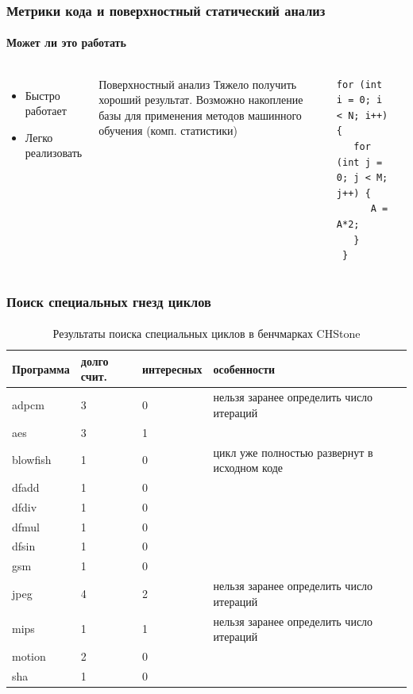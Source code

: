 \documentclass{beamer}              %
\begin{document}
\begin{frame}[fragile]
\frametitle{Метрики кода и поверхностный статический анализ}
  \framesubtitle{Может ли это работать}
  \begin{columns}
      \begin{itemize}
        \item Быстро работает
        \item Легко реализовать
      \end{itemize}
      
      \begin{block}{Поверхностный анализ}
         Тяжело получить хороший результат. Возможно накопление базы для применения методов машинного обучения (комп. статистики)
      \end{block}

      
      
\begin{lstlisting}[frame=single]
 for (int i = 0; i < N; i++) {
   for (int j = 0; j < M; j++) {
      A = A*2;
   }
 }
\end{lstlisting}
\label{clone_listing}
      
  \end{columns}
  
\end{frame}

\begin{frame}[fragile]
\frametitle{Поиск специальных гнезд циклов}
  \framesubtitle{}
  \begin{table}
    \begin{tabular}{ | p{1.5cm} | p{2cm} | p{1cm} | p{6cm} |}
    \hline
    Программа & долго счит. & интересных & особенности \\ \hline
    adpcm & 3 & 0 & нельзя заранее определить число итераций \\ \hline
    aes & 3 & 1 &  \\ \hline
    blowfish & 1 & 0 & цикл уже полностью развернут в исходном коде \\ \hline
    dfadd & 1 & 0 &  \\ \hline
    dfdiv & 1 & 0 &  \\ \hline
    dfmul & 1 & 0 &  \\ \hline
    dfsin & 1 & 0 &  \\ \hline
    gsm & 1 & 0 &  \\ \hline
    jpeg & 4 & 2 & нельзя заранее определить число итераций \\ \hline
    mips & 1 & 1 & нельзя заранее определить число итераций \\ \hline
    motion & 2 & 0 &  \\ \hline
    sha & 1 & 0 &  \\ \hline
    \end{tabular} 
    \caption{Результаты поиска специальных циклов в бенчмарках CHStone}
    \label{table:CHStoneSingularLoops}
\end{table}
\end{frame}
\end{document}
